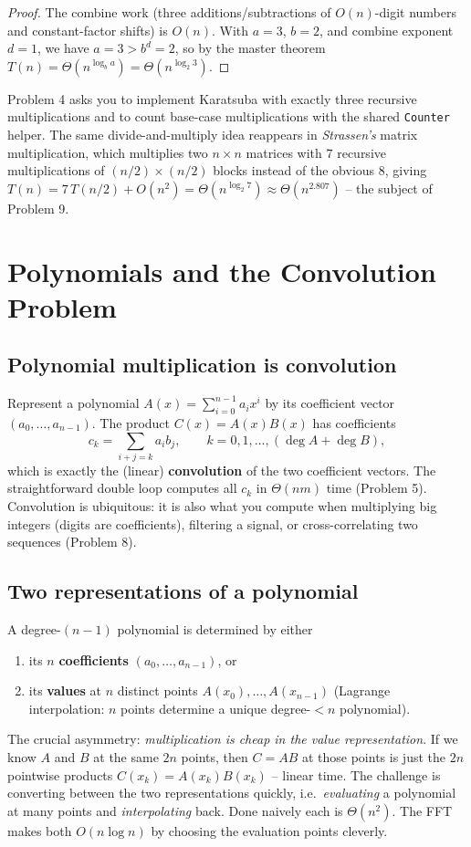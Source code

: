 \documentclass[11pt]{article}
\begin{document}
\begin{proof}
The combine work (three additions/subtractions of $O(n)$-digit numbers and constant-factor
shifts) is $O(n)$. With $a = 3$, $b = 2$, and combine exponent $d = 1$, we have $a = 3 >
b^d = 2$, so by the master theorem $T(n) = \Theta(n^{\log_b a}) = \Theta(n^{\log_2 3})$.
\end{proof}

Problem 4 asks you to implement Karatsuba with exactly three recursive multiplications and
to count base-case multiplications with the shared \texttt{Counter} helper. The same
divide-and-multiply idea reappears in \emph{Strassen's} matrix multiplication, which
multiplies two $n \times n$ matrices with $7$ recursive multiplications of $(n/2) \times
(n/2)$ blocks instead of the obvious $8$, giving $T(n) = 7\,T(n/2) + O(n^2) =
\Theta(n^{\log_2 7}) \approx \Theta(n^{2.807})$ -- the subject of Problem 9.

\section{Polynomials and the Convolution Problem}

\subsection{Polynomial multiplication is convolution}

Represent a polynomial $A(x) = \sum_{i=0}^{n-1} a_i x^i$ by its coefficient vector
$(a_0, \ldots, a_{n-1})$. The product $C(x) = A(x) B(x)$ has coefficients
\[
c_k = \sum_{i + j = k} a_i b_j, \qquad k = 0, 1, \ldots, (\deg A + \deg B),
\]
which is exactly the (linear) \textbf{convolution} of the two coefficient vectors. The
straightforward double loop computes all $c_k$ in $\Theta(nm)$ time (Problem 5). Convolution
is ubiquitous: it is also what you compute when multiplying big integers (digits are
coefficients), filtering a signal, or cross-correlating two sequences (Problem 8).

\subsection{Two representations of a polynomial}

A degree-$(n-1)$ polynomial is determined by either
\begin{enumerate}[label=(\alph*)]
    \item its $n$ \textbf{coefficients} $(a_0, \ldots, a_{n-1})$, or
    \item its \textbf{values} at $n$ distinct points $A(x_0), \ldots, A(x_{n-1})$
    (Lagrange interpolation: $n$ points determine a unique degree-$<n$ polynomial).
\end{enumerate}
The crucial asymmetry: \emph{multiplication is cheap in the value representation}. If we know
$A$ and $B$ at the same $2n$ points, then $C = AB$ at those points is just the $2n$ pointwise
products $C(x_k) = A(x_k) B(x_k)$ -- linear time. The challenge is converting between the two
representations quickly, i.e.\ \emph{evaluating} a polynomial at many points and
\emph{interpolating} back. Done naively each is $\Theta(n^2)$. The FFT makes both
$O(n \log n)$ by choosing the evaluation points cleverly.
\end{document}
